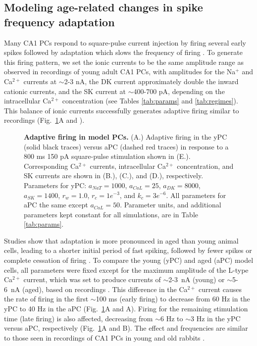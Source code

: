 \documentclass[10pt,letterpaper]{article}
\newcommand{\Ca}{Ca$^{2+}$}
\newcommand{\Na}{Na$^{+}$}
\begin{document}
\subsection*{Modeling age-related changes in spike frequency adaptation}
Many CA1 PCs respond to square-pulse current injection by firing several early spikes followed by adaptation which slows the frequency of firing \cite{gant2006early,gu2008sk,moyer1992nimodipine}. To generate this firing pattern, we set the ionic currents to be the same amplitude range as observed in recordings of young adult CA1 PCs, with amplitudes for the {\Na} and {\Ca} currents at $\sim$2-3 nA, the DK current approximately double the inward cationic currents, and the SK current at $\sim$400-700 pA, depending on the intracellular {\Ca} concentration (see Tables \ref{tab:params} and \ref{tab:regimes}). This balance of ionic currents successfully generates adaptive firing similar to recordings (Fig.~\ref{fig:adapt}A and ).

\begin{figure}[h!]
\centering
\caption{{\bf Adaptive firing in model PCs.}
(A.) Adaptive firing in the yPC (solid black traces) versus aPC (dashed red traces) in response to a 800 ms 150 pA square-pulse stimulation shown in (E.). Corresponding {\Ca} currents, intracellular {\Ca} concentration, and SK currents are shown in (B.), (C.), and (D.), respectively. Parameters for yPC: $a_{NaT}=1000$, $a_{CaL}=25$, $a_{DK}=8000$, $a_{SK}=1400$, $r_{w}=1.0$, $r_{c}=1e^{-3}$, and $k_{c}=3e^{-6}$. All parameters for aPC the same except $a_{CaL}=50$. Parameter units, and additional parameters kept constant for all simulations, are in Table \ref{tab:params}.}
\label{fig:adapt}
\end{figure}

Studies show that adaptation is more pronounced in aged than young animal cells, leading to a shorter initial period of fast spiking, followed by fewer spikes or complete cessation of firing \cite{disterhoft1996calcium,gant2006early,moyer1992nimodipine,tombaugh2005slow}. To compare the young (yPC) and aged (aPC) model cells, all parameters were fixed except for the maximum amplitude of the L-type {\Ca} current, which was set to produce currents of $\sim$2-3~nA (young) or $\sim$5-6~nA (aged), based on recordings \cite{campbell1996aging}. This difference in the {\Ca} current causes the rate of firing in the first $\sim$100 ms (early firing) to decrease from 60 Hz in the yPC to 40 Hz in the aPC (Fig.~\ref{fig:adapt}A and A). Firing for the remaining stimulation time (late firing) is also affected, decreasing from $\sim$6 Hz to $\sim$3 Hz in the yPC versus aPC, respectively (Fig.~\ref{fig:adapt}A and B). The effect and frequencies are similar to those seen in recordings of CA1 PCs in young and old rabbits \cite{moyer1992nimodipine}.
\end{document}
